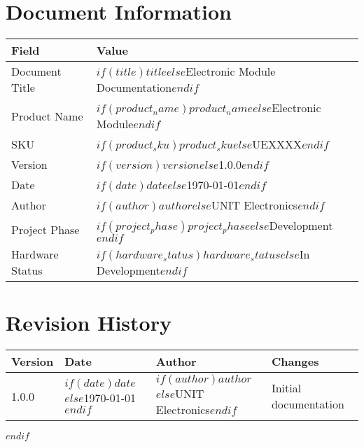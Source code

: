 \documentclass[11pt,a4paper]{article}
\begin{document}
\newpage
\thispagestyle{plain}

\section*{Document Information}

\begin{table}[H]
\centering
\begin{tabular}{ll}
\toprule
\textbf{Field} & \textbf{Value} \\
\midrule
Document Title & $if(title)$$title$$else$Electronic Module Documentation$endif$ \\
Product Name & $if(product_name)$$product_name$$else$Electronic Module$endif$ \\
SKU & $if(product_sku)$$product_sku$$else$UEXXXX$endif$ \\
Version & $if(version)$$version$$else$1.0.0$endif$ \\
Date & $if(date)$$date$$else$\today$endif$ \\
Author & $if(author)$$author$$else$UNIT Electronics$endif$ \\
Project Phase & $if(project_phase)$$project_phase$$else$Development$endif$ \\
Hardware Status & $if(hardware_status)$$hardware_status$$else$In Development$endif$ \\
\bottomrule
\end{tabular}
\end{table}

\vspace{1cm}

\section*{Revision History}

\begin{table}[H]
\centering
\begin{tabular}{llll}
\toprule
\textbf{Version} & \textbf{Date} & \textbf{Author} & \textbf{Changes} \\
\midrule
1.0.0 & $if(date)$$date$$else$\today$endif$ & $if(author)$$author$$else$UNIT Electronics$endif$ & Initial documentation \\
\bottomrule
\end{tabular}
\end{table}

\newpage
$endif$

\tableofcontents
\newpage

\end{document}
